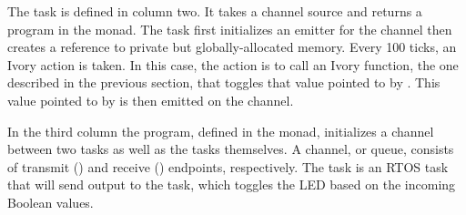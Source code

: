 The  task is defined in column two.  It takes a channel source and
returns a program in the  monad.  The task first
initializes an emitter for the channel then creates a reference to private but
globally-allocated memory.  Every 100 ticks, an Ivory action is taken.  In this
case, the action is to call an Ivory function, the one described in the
previous section, that toggles that value pointed to by .  This value
pointed to by  is then emitted on the channel.

In the third column the program, defined in the  monad, initializes a
channel between two tasks as well as the tasks themselves.  A channel, or queue,
consists of transmit () and receive () endpoints, respectively.
The  task is an RTOS task that will send output to the
 task, which toggles the LED based on the incoming Boolean
values.

